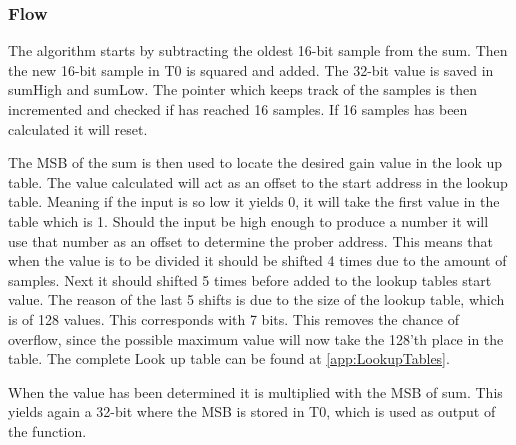 \subsubsection*{Flow}


The algorithm starts by subtracting the oldest 16-bit sample from the sum. Then the new 16-bit sample in T0 is squared and added. The 32-bit value is saved in sumHigh and sumLow. The pointer which keeps track of the samples is then incremented and checked if has reached 16 samples. If 16 samples has been calculated it will reset.

The MSB of the sum is then used to locate the desired gain value in the look up table. The value calculated will act as an offset to the start address in the lookup table. Meaning if the input is so low it yields 0, it will take the first value in the table which is 1. Should the input be high enough to produce a number it will use that number as an offset to determine the prober address. This means that when the value is to be divided it should be shifted 4 times due to the amount of samples. Next it should shifted 5 times before added to the lookup tables start value. The reason of the last 5 shifts is due to the size of the lookup table, which is of 128 values. This corresponds with 7 bits. This removes the chance of overflow, since the possible maximum value will now take the 128'th place in the table. The complete Look up table can be found at \autoref{app:LookupTables}. 

When the value has been determined it is multiplied with the MSB of sum. This yields again a 32-bit where the MSB is stored in T0, which is used as output of the function.